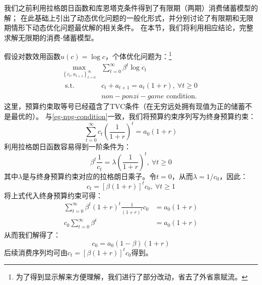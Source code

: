 我们之前利用拉格朗日函数和库恩塔克条件得到了有限期（两期）消费储蓄模型的解；
在此基础上引出了动态优化问题的一般化形式，并分别讨论了有限期和无限期情形下动态优化问题最优解的相关条件。
在本节，我们将利用相应结论，完整求解无限期的消费-储蓄模型。

假设对数效用函数$u(c) = \log c$，个体优化问题为：\footnote{为了得到显示解来方便理解，我们进行了部分改动，省去了外省禀赋流。}
\begin{equation*}
    \begin{aligned}
        \max _{\left\{c_t, a_{t+1}\right\}_{t=0}^{\infty}} & \sum_{t=0}^{\infty} \beta^t \log c_t \\
        \text { s.t. } & c_t+a_{t+1}=a_t(1+r), ~\forall t \geq 0 \\
        & non-ponzi-game \text { condition. }
    \end{aligned}
\end{equation*}
这里，预算约束取等号已经蕴含了TVC条件（在无穷远处拥有现值为正的储蓄不是最优的）。
与\cref{eg-npg-condition}一致，我们将预算约束序列写为终身预算约束：
\begin{equation*}
    \sum_{t=0}^{\infty} c_t\left(\frac{1}{1+r}\right)^t=a_0(1+r)
\end{equation*}
利用拉格朗日函数容易得到一阶条件为：
\begin{equation*}
    \beta^t \frac{1}{c_t}=\lambda\left(\frac{1}{1+r}\right)^t, ~\forall t \geq 0
\end{equation*}
其中$\lambda$是与终身预算约束对应的拉格朗日乘子。令$t=0$，从而$\lambda = 1/c_0$，因此：
\begin{equation*}
    c_t = \left[\beta(1+r)\right]^tc_0, ~\forall t \geq 1
\end{equation*}
将上式代入终身预算约束可得：
\begin{equation*}
    \begin{aligned}
        \sum_{t=0}^{\infty} \beta^t(1+r)^t \frac{1}{(1+r)^t} c_0 & =a_0(1+r) \\
        c_0 \sum_{t=0}^{\infty} \beta^t & =a_0(1+r)
    \end{aligned}
\end{equation*}
从而我们解得了：
\begin{equation*}
    c_0 = a_0(1-\beta)(1+r)
\end{equation*}
后续消费序列均可由$c_t=\left[\beta(1+r)\right]^tc_0$得到。